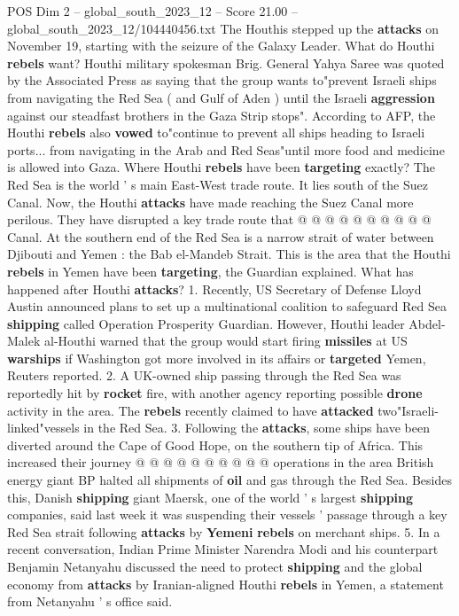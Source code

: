 \begin{textsample}{POS Dim 2 – global\_south\_2023\_12 – Score 21.00 – global\_south\_2023\_12/104440456.txt}
The Houthis stepped up the \textbf{attacks} on November 19, starting with the seizure of the Galaxy Leader.
What do Houthi \textbf{rebels} want?
Houthi military spokesman Brig.
General Yahya Saree was quoted by the Associated Press as saying that the group wants to"prevent Israeli ships from navigating the Red Sea ( and Gulf of Aden ) until the Israeli \textbf{aggression} against our steadfast brothers in the Gaza Strip stops".
According to AFP, the Houthi \textbf{rebels} also \textbf{vowed} to"continue to prevent all ships heading to Israeli ports... from navigating in the Arab and Red Seas"until more food and medicine is allowed into Gaza.
Where Houthi \textbf{rebels} have been \textbf{targeting} exactly?
The Red Sea is the world ' s main East-West trade route.
It lies south of the Suez Canal.
Now, the Houthi \textbf{attacks} have made reaching the Suez Canal more perilous.
They have disrupted a key trade route that @ @ @ @ @ @ @ @ @ @ Canal.
At the southern end of the Red Sea is a narrow strait of water between Djibouti and Yemen : the Bab el-Mandeb Strait.
This is the area that the Houthi \textbf{rebels} in Yemen have been \textbf{targeting}, the Guardian explained.
What has happened after Houthi \textbf{attacks}? 1.
Recently, US Secretary of Defense Lloyd Austin announced plans to set up a multinational coalition to safeguard Red Sea \textbf{shipping} called Operation Prosperity Guardian.
However, Houthi leader Abdel-Malek al-Houthi warned that the group would start firing \textbf{missiles} at US \textbf{warships} if Washington got more involved in its affairs or \textbf{targeted} Yemen, Reuters reported. 2.
A UK-owned ship passing through the Red Sea was reportedly hit by \textbf{rocket} fire, with another agency reporting possible \textbf{drone} activity in the area.
The \textbf{rebels} recently claimed to have \textbf{attacked} two"Israeli-linked"vessels in the Red Sea. 3.
Following the \textbf{attacks}, some ships have been diverted around the Cape of Good Hope, on the southern tip of Africa.
This increased their journey @ @ @ @ @ @ @ @ @ @ operations in the area British energy giant BP halted all shipments of \textbf{oil} and gas through the Red Sea.
Besides this, Danish \textbf{shipping} giant Maersk, one of the world ' s largest \textbf{shipping} companies, said last week it was suspending their vessels ' passage through a key Red Sea strait following \textbf{attacks} by \textbf{Yemeni} \textbf{rebels} on merchant ships. 5.
In a recent conversation, Indian Prime Minister Narendra Modi and his counterpart Benjamin Netanyahu discussed the need to protect \textbf{shipping} and the global economy from \textbf{attacks} by Iranian-aligned Houthi \textbf{rebels} in Yemen, a statement from Netanyahu ' s office said.

\end{textsample}
